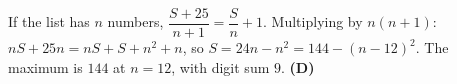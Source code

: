 If the list has $n$ numbers, $\dfrac{S+25}{n+1}=\dfrac Sn+1$. Multiplying by $n(n+1)$: $nS+25n=nS+S+n^2+n$, so $S=24n-n^2=144-(n-12)^2$. The maximum is $144$ at $n=12$, with digit sum $9$. \textbf{(D)}
